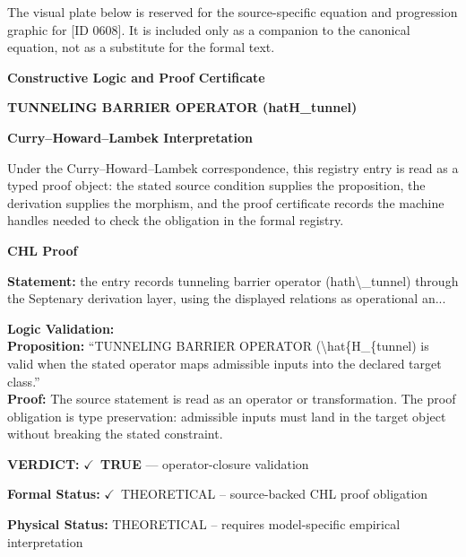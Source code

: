 \begingroup\footnotesize\sloppy
The visual plate below is reserved for the source-specific equation and progression graphic for [ID 0608]. It is included only as a companion to the canonical equation, not as a substitute for the formal text.
\par\endgroup
\ifTZPDarkEdition
{}
\fi

\clearpage
\begingroup\tzpsupportsetup
\noindent\textbf{\fontsize{10.8pt}{12.8pt}\selectfont [ID 0608] Constructive Logic and Proof Certificate}\par
\noindent\textbf{\fontsize{10pt}{12pt}\selectfont TUNNELING BARRIER OPERATOR (hatH\_tunnel)}\par
\vspace{0.45em}
\begingroup
\footnotesize
\setlength{\parskip}{0.22em}
\setlength{\parindent}{0pt}
\noindent\textbf{Curry--Howard--Lambek Interpretation}\par
Under the Curry--Howard--Lambek correspondence, this registry entry is read as a typed proof
object: the stated source condition supplies the proposition, the derivation supplies the
morphism, and the proof certificate records the machine handles needed to check the obligation
in the formal registry.

\vspace{0.45em}
\noindent\textbf{CHL Proof}\par
\textbf{Statement:} the entry records tunneling barrier operator (hath\textbackslash{}\_tunnel) through the Septenary
derivation layer, using the displayed relations as operational an...

\textbf{Logic Validation:}\\
\textbf{Proposition:} ``TUNNELING BARRIER OPERATOR (\textbackslash{}hat\{H\_\{tunnel) is valid when the stated operator maps
admissible inputs into the declared target class.''\\
\textbf{Proof:} The source statement is read as an operator or transformation. The proof obligation is
type preservation: admissible inputs must land in the target object without breaking the
stated constraint.

\textbf{VERDICT:} \ensuremath{\checkmark}\ \textbf{TRUE} --- operator-closure validation

\textbf{Formal Status:} \ensuremath{\checkmark}\ THEORETICAL -- source-backed CHL proof obligation

\textbf{Physical Status:} THEORETICAL -- requires model-specific empirical interpretation
\par\vspace{0.45em}
\par
\ifTZPDarkEdition
{}
\fi
\endgroup
\endgroup

